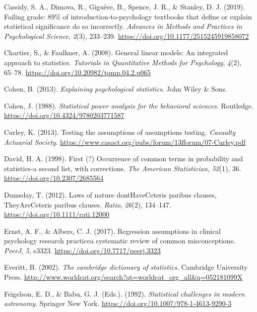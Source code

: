 \documentclass[
]{book}
\begin{document}
\leavevmode\hypertarget{ref-Cassidy2019}{}%
Cassidy, S. A., Dimova, R., Giguère, B., Spence, J. R., \& Stanley, D.
J. (2019). Failing grade: 89\% of introduction-to-psychology textbooks
that define or explain statistical significance do so incorrectly.
\emph{Advances in Methods and Practices in Psychological Science},
\emph{2}(3), 233--239. \url{https://doi.org/10.1177/2515245919858072}

\leavevmode\hypertarget{ref-Chartier2008}{}%
Chartier, S., \& Faulkner, A. (2008). General linear models: An
integrated approach to statistics. \emph{Tutorials in Quantitative
Methods for Psychology}, \emph{4}(2), 65--78.
\url{https://doi.org/10.20982/tqmp.04.2.p065}

\leavevmode\hypertarget{ref-cohen2013explaining}{}%
Cohen, B. (2013). \emph{Explaining psychological statistics}. John Wiley
\& Sons.

\leavevmode\hypertarget{ref-Cohen1988}{}%
Cohen, J. (1988). \emph{Statistical power analysis for the behavioral
sciences}. Routledge. \url{https://doi.org/10.4324/9780203771587}

\leavevmode\hypertarget{ref-Curley013}{}%
Curley, K. (2013). Testing the assumptions of assumptions testing.
\emph{Casualty Actuarial Society}.
\url{https://www.casact.org/pubs/forum/13fforum/07-Curley.pdf}

\leavevmode\hypertarget{ref-David1998}{}%
David, H. A. (1998). First (?) Occurrence of common terms in probability
and statistics-a second list, with corrections. \emph{The American
Statistician}, \emph{52}(1), 36. \url{https://doi.org/10.2307/2685564}

\leavevmode\hypertarget{ref-Dumsday2012}{}%
Dumsday, T. (2012). Laws of nature dontHaveCeteris paribus clauses,
TheyAreCeteris paribus clauses. \emph{Ratio}, \emph{26}(2), 134--147.
\url{https://doi.org/10.1111/rati.12000}

\leavevmode\hypertarget{ref-Ernst2017}{}%
Ernst, A. F., \& Albers, C. J. (2017). Regression assumptions in
clinical psychology research practicea systematic review of common
misconceptions. \emph{PeerJ}, \emph{5}, e3323.
\url{https://doi.org/10.7717/peerj.3323}

\leavevmode\hypertarget{ref-everitt2002cambridge}{}%
Everitt, B. (2002). \emph{The cambridge dictionary of statistics}.
Cambridge University Press.
\url{http://www.worldcat.org/search?qt=worldcat_org_all\&q=052181099X}

\leavevmode\hypertarget{ref-Feigelson1992}{}%
Feigelson, E. D., \& Babu, G. J. (Eds.). (1992). \emph{Statistical
challenges in modern astronomy}. Springer New York.
\url{https://doi.org/10.1007/978-1-4613-9290-3}
\end{document}
